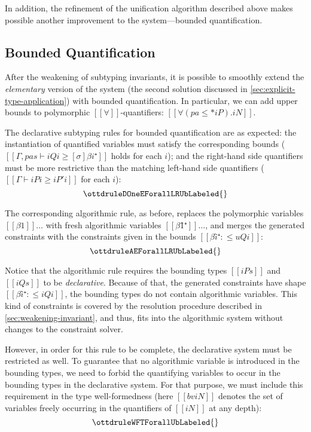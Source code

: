 In addition, the refinement of the unification algorithm described above
makes possible another improvement to the system---bounded quantification.

\subsection{Bounded Quantification}

After the weakening of subtyping invariants, 
it is possible to smoothly extend the \emph{elementary}
version of the system 
(the second solution discussed in \cref{sec:explicit-type-application})
 with bounded quantification.
In particular, we can add upper bounds to polymorphic $[[∀]]$-quantifiers:
$[[∀(pa ≤* iP). iN]]$. 

The declarative subtyping rules for bounded quantification are as expected:
the instantiation of quantified variables must satisfy the corresponding bounds
($[[Γ, pas ⊢ iQi ≥ [σ]βi⁺]]$ holds for each $i$);
and the right-hand side quantifiers must be more restrictive than the matching left-hand side
quantifiers ($[[Γ ⊢ iPi ≥ iP'i]]$ for each $i$):
$$\ottdruleDOneEForallLRUbLabeled{}$$

The corresponding algorithmic rule, as before,
replaces the polymorphic variables $[[β1]]\dots$ with fresh 
algorithmic variables $[[β1̂⁺]]\dots$, and merges the generated
constraints with the constraints given in the bounds
$[[βî⁺ :≤ uQi]]$:
$$\ottdruleAEForallLRUbLabeled{}$$

Notice that the algorithmic rule 
requires the bounding types $[[iPs]]$ and $[[iQs]]$ to be \emph{declarative}.
Because of that, the generated constraints have shape $[[βî⁺ :≤ iQi]]$,
\ie the bounding types do not contain algorithmic variables.
This kind of constraints is covered by the resolution procedure described in
\cref{sec:weakening-invariant}, and thus,  fits 
into the algorithmic system without changes to the constraint solver.

However, in order for this rule to be complete, 
the declarative system must be restricted as well.
To guarantee that no algorithmic variable is introduced in the bounding types,
we need to forbid the quantifying variables to occur in the bounding types in the declarative system.
For that purpose, we must include this requirement in the type well-formedness
(here $[[bv iN]]$ denotes the set of variables freely occurring 
in the quantifiers of $[[iN]]$ at any depth):
$$\ottdruleWFTForallUbLabeled{}$$

